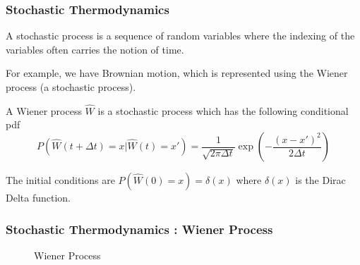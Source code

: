 \documentclass{beamer}
\begin{document}
\begin{frame}
  \frametitle{Stochastic Thermodynamics}
  \begin{definition}

    A stochastic process is a sequence of random variables where the indexing of the variables
    often carries the notion of time.

  \end{definition}
  For example, we have Brownian motion, which is represented using the Wiener process
  (a stochastic process).
  \begin{definition}
    A Wiener process $\hat{W}$ is a stochastic process which has the following conditional pdf
    \begin{displaymath}
      P(\hat{W}(t+\Delta t)=x | \hat{W}(t)=x') = \frac{1}{\sqrt{2 \pi \Delta t}}\exp(-\frac{(x-x')^2}{2 \Delta t})
    \end{displaymath}

  \end{definition}
  The initial conditions are $P(\hat{W}(0) = x) = \delta(x)$ where $\delta(x)$ is the Dirac Delta
  function.
\end{frame}

\begin{frame}
  \frametitle{Stochastic Thermodynamics : Wiener Process}
  \begin{figure}
    \begin{center}
    \end{center}
    \caption{Wiener Process}\label{fig:1}
  \end{figure}
  
\end{frame}
\end{document}
